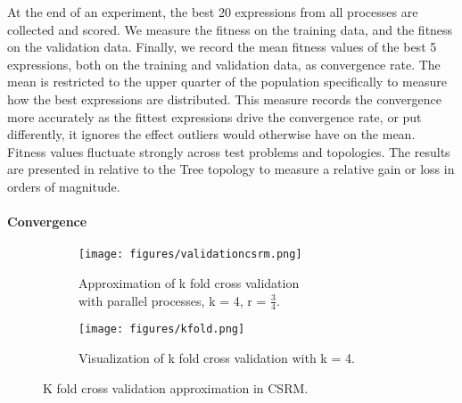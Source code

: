 At the end of an experiment, the best 20 expressions from all processes are collected and scored. We measure the fitness on the training data, and the fitness on the validation data. 
Finally, we record the mean fitness values of the best 5 expressions, both on the training and validation data, as convergence rate.
The mean is restricted to the upper quarter of the population specifically to measure how the best expressions are distributed. %
This measure records the convergence more accurately as the fittest expressions drive the convergence rate, or put differently, it ignores the effect outliers would otherwise have on the mean. 
Fitness values fluctuate strongly across test problems and topologies. The results are presented in relative to the Tree topology to measure a relative gain or loss in orders of magnitude.


\paragraph{Convergence}


\begin{figure}
    \label{fig:ckfold}
	\begin{subfigure}{0.5\textwidth}\label{fig:csrmkfold}
    \texttt{[image: figures/validationcsrm.png]}
    \caption{Approximation of k fold cross validation \\with parallel processes, k = 4,  r = $\frac{3}{4}$.}
    \end{subfigure}
	\begin{subfigure}{0.5\textwidth}    \label{fig:kfold}

    \centering
    \texttt{[image: figures/kfold.png]}
    \caption{Visualization of k fold cross validation with k = 4.}
    \end{subfigure}%
    \caption{K fold cross validation approximation in CSRM.}
 \end{figure}
 
